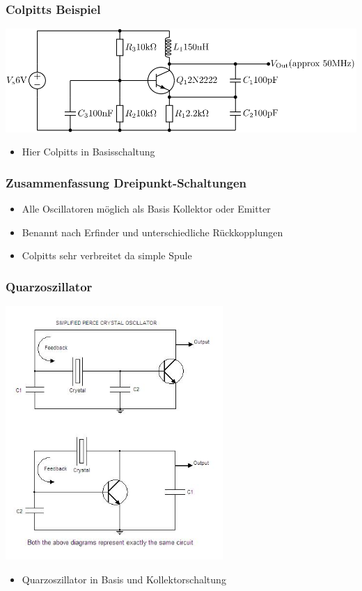 \begin{frame}
    \frametitle{Colpitts Beispiel}
        \begin{center}
        \includegraphics[width=1\textwidth]{a07/NPN_Colpitts_oscillator_collector_coil.png} \\[1em] \large
     	\begin{itemize}
			\item Hier Colpitts in Basisschaltung
    	\end{itemize}
    \end{center}
\end{frame}

\begin{frame}
    \frametitle{Zusammenfassung Dreipunkt-Schaltungen}
         \begin{itemize}
			\item Alle Oscillatoren möglich als Basis Kollektor oder Emitter
			\item Benannt nach Erfinder und unterschiedliche Rückkopplungen
			\item Colpitts sehr verbreitet da simple Spule
    	\end{itemize}
\end{frame}

\begin{frame}
    \frametitle{Quarzoszillator}
    \begin{center}
        \includegraphics[width=0.62\textwidth]{a07/PIERCE_CRYSTAL_OSCILLATOR.jpg} \large
     	\begin{itemize}
			\item Quarzoszillator in Basis und Kollektorschaltung
    	\end{itemize}
    \end{center}
\end{frame}

